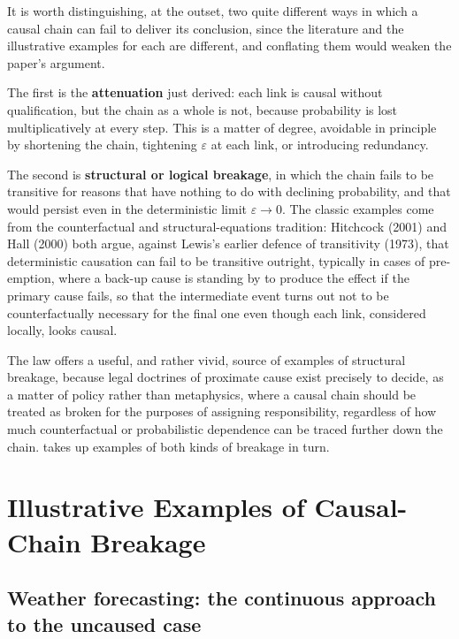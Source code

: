 \documentclass[11pt]{article}
\theoremstyle{definition}
\newcommand{\eps}{\varepsilon}
\begin{document}
It is worth distinguishing, at the outset, two quite different ways in which a causal chain can fail to deliver its conclusion, since the literature and the illustrative examples for each are different, and conflating them would weaken the paper's argument.

The first is the \textbf{attenuation} just derived: each link is causal without qualification, but the chain as a whole is not, because probability is lost multiplicatively at every step. This is a matter of degree, avoidable in principle by shortening the chain, tightening $\eps$ at each link, or introducing redundancy.

The second is \textbf{structural or logical breakage}, in which the chain fails to be transitive for reasons that have nothing to do with declining probability, and that would persist even in the deterministic limit $\eps \to 0$. The classic examples come from the counterfactual and structural-equations tradition: Hitchcock (2001) and Hall (2000) both argue, against Lewis's earlier defence of transitivity (1973), that deterministic causation can fail to be transitive outright, typically in cases of pre-emption, where a back-up cause is standing by to produce the effect if the primary cause fails, so that the intermediate event turns out not to be counterfactually necessary for the final one even though each link, considered locally, looks causal.

The law offers a useful, and rather vivid, source of examples of structural breakage, because legal doctrines of proximate cause exist precisely to decide, as a matter of policy rather than metaphysics, where a causal chain should be treated as broken for the purposes of assigning responsibility, regardless of how much counterfactual or probabilistic dependence can be traced further down the chain.  takes up examples of both kinds of breakage in turn.

\section{Illustrative Examples of Causal-Chain Breakage}
\label{sec:examples}

\subsection{Weather forecasting: the continuous approach to the uncaused case}
\label{subsec:weather}
\end{document}
